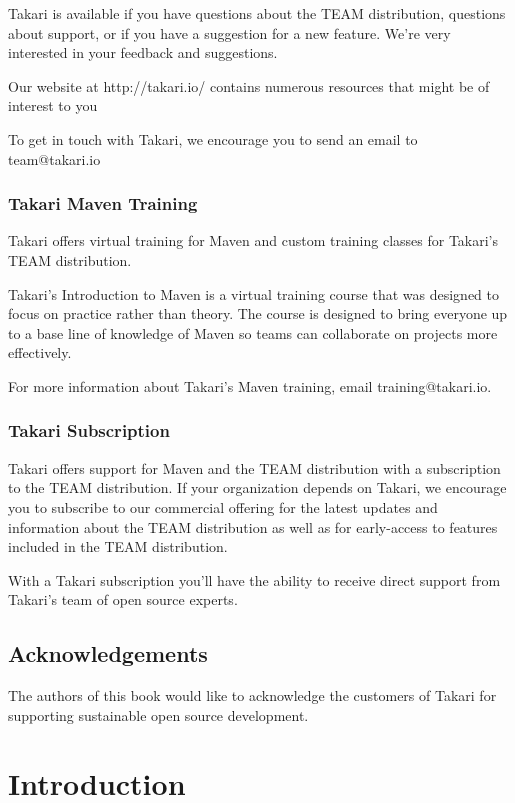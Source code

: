 \documentclass[a4paper]{book}
\newcommand{\chap}[1]{\newpage\thispagestyle{empty}\chapter{#1}\label{chap:\thechapter}}
\begin{document}
Takari is available if you have questions about the TEAM distribution, questions about support, or if you have a suggestion for a new feature. We're very interested in your feedback and suggestions.

Our website at http://takari.io/ contains numerous resources that might be of interest to you

To get in touch with Takari, we encourage you to send an email to team@takari.io

\subsection{Takari Maven Training}\label{takari-maven-training}

Takari offers virtual training for Maven and custom training classes for Takari's TEAM distribution.

Takari's Introduction to Maven is a virtual training course that was designed to focus on practice rather than theory. The course is designed to bring everyone up to a base line of knowledge of Maven so teams can collaborate on projects more effectively.

For more information about Takari's Maven training, email training@takari.io.

\subsection{Takari Subscription}\label{takari-subscription}

Takari offers support for Maven and the TEAM distribution with a subscription to the TEAM distribution. If your organization depends on Takari, we encourage you to subscribe to our commercial offering for the latest updates and information about the TEAM distribution as well as for early-access to features included in the TEAM distribution.

With a Takari subscription you'll have the ability to receive direct support from Takari's team of open source experts.

\section{Acknowledgements}\label{acknowledgements}

The authors of this book would like to acknowledge the customers of Takari for supporting sustainable open source development.

\chap{Introduction}\label{introduction}
\end{document}
